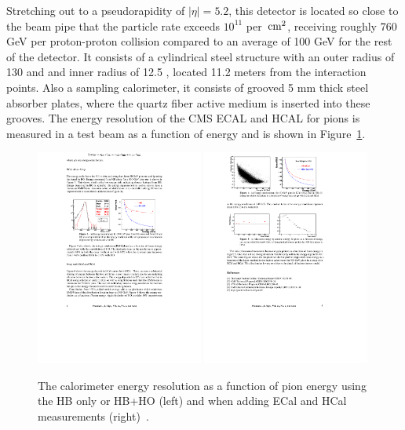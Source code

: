 Stretching out to a pseudorapidity of $|\eta|= 5.2$, this detector is located so close to the beam pipe that the particle rate exceeds $10^{11}$ per $\,\text{cm}^2$, receiving roughly 760 GeV per proton-proton collision compared to an average of 100 GeV for the rest of the detector. It consists of a cylindrical steel structure with an outer radius of 130 \cm and and inner radius of 12.5 \cm, located 11.2 meters from the interaction points. Also a sampling calorimeter, it consists of grooved 5 mm thick steel absorber plates, where the quartz fiber active medium is inserted into these grooves.
The energy resolution of the CMS ECAL and HCAL for pions is measured in a test beam as a function of energy and is shown in Figure~\ref{fig:cms:hcal-res}.

\begin{figure}[h] 
    \centering
    \includegraphics[width=0.49\textwidth]{figures/cms/hcal_res.pdf}
    \includegraphics[width=0.49\textwidth]{figures/cms/hcal_ecal_res.pdf}
    \caption{The calorimeter energy resolution as a function of pion energy using the HB only or HB+HO (left) and when adding ECal and HCal measurements (right)~\cite{Sharma2007}.}
    \label{fig:cms:hcal-res}
\end{figure}
